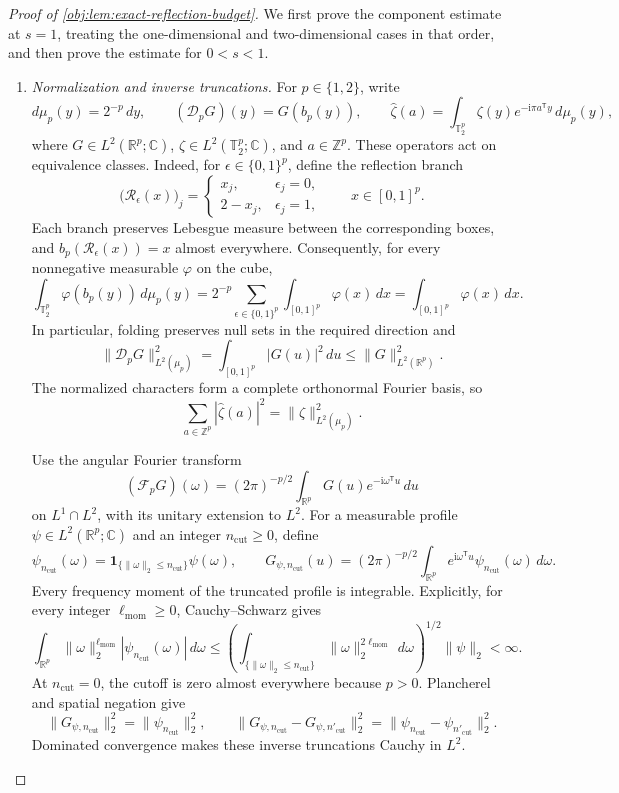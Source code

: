 \documentclass[11pt]{article}
\begin{document}
\begin{proof}[Proof of \cref{obj:lem:exact-reflection-budget}]
We first prove the component estimate at \(s=1\), treating the one-dimensional and two-dimensional cases in that order, and then prove the estimate for \(0<s<1\).

\begin{enumerate}
\item \textit{Normalization and inverse truncations.}
For \(p\in\{1,2\}\), write
\[
d\mu_p(y)=2^{-p}\,dy,
\qquad
(\mathscr D_pG)(y)=G(b_p(y)),
\qquad
\widehat\zeta(a)=
\int_{\mathbb T_2^p}\zeta(y)e^{-\mathrm i\pi a^{\mathsf T}y}\,d\mu_p(y),
\]
where \(G\in L^2(\mathbb R^p;\mathbb C)\), \(\zeta\in L^2(\mathbb T_2^p;\mathbb C)\), and \(a\in\mathbb Z^p\). These operators act on equivalence classes. Indeed, for \(\epsilon\in\{0,1\}^p\), define the reflection branch
\[
\bigl(\mathscr R_\epsilon(x)\bigr)_j
=
\begin{cases}
x_j,&\epsilon_j=0,\\
2-x_j,&\epsilon_j=1,
\end{cases}
\qquad x\in[0,1]^p.
\]
Each branch preserves Lebesgue measure between the corresponding boxes, and
\(b_p(\mathscr R_\epsilon(x))=x\) almost everywhere. Consequently, for every nonnegative measurable \(\varphi\) on the cube,
\[
\int_{\mathbb T_2^p}\varphi(b_p(y))\,d\mu_p(y)
=
2^{-p}\sum_{\epsilon\in\{0,1\}^p}
\int_{[0,1]^p}\varphi(x)\,dx
=
\int_{[0,1]^p}\varphi(x)\,dx.
\]
In particular, folding preserves null sets in the required direction and
\[
\|\mathscr D_pG\|_{L^2(\mu_p)}^2
=
\int_{[0,1]^p}|G(u)|^2\,du
\leq
\|G\|_{L^2(\mathbb R^p)}^2.
\]
The normalized characters form a complete orthonormal Fourier basis, so
\[
\sum_{a\in\mathbb Z^p}|\widehat\zeta(a)|^2
=
\|\zeta\|_{L^2(\mu_p)}^2.
\]

Use the angular Fourier transform
\[
(\mathcal F_pG)(\omega)
=
(2\pi)^{-p/2}
\int_{\mathbb R^p}G(u)e^{-\mathrm i\omega^{\mathsf T}u}\,du
\]
on \(L^1\cap L^2\), with its unitary extension to \(L^2\).
For a measurable profile \(\psi\in L^2(\mathbb R^p;\mathbb C)\) and an integer
\(n_{\mathrm{cut}}\geq0\), define
\[
\psi_{n_{\mathrm{cut}}}(\omega)
=
\mathbf1_{\{\|\omega\|_2\leq n_{\mathrm{cut}}\}}\psi(\omega),
\qquad
G_{\psi,n_{\mathrm{cut}}}(u)
=
(2\pi)^{-p/2}
\int_{\mathbb R^p}
e^{\mathrm i\omega^{\mathsf T}u}
\psi_{n_{\mathrm{cut}}}(\omega)\,d\omega.
\]
Every frequency moment of the truncated profile is integrable. Explicitly, for every integer \(\ell_{\mathrm{mom}}\geq0\), Cauchy--Schwarz gives
\[
\int_{\mathbb R^p}
\|\omega\|_2^{\ell_{\mathrm{mom}}}
|\psi_{n_{\mathrm{cut}}}(\omega)|\,d\omega
\leq
\left(
\int_{\{\|\omega\|_2\leq n_{\mathrm{cut}}\}}
\|\omega\|_2^{2\ell_{\mathrm{mom}}}\,d\omega
\right)^{1/2}
\|\psi\|_2
<\infty.
\]
At \(n_{\mathrm{cut}}=0\), the cutoff is zero almost everywhere because \(p>0\).
Plancherel and spatial negation give
\[
\|G_{\psi,n_{\mathrm{cut}}}\|_2^2
=
\|\psi_{n_{\mathrm{cut}}}\|_2^2,
\qquad
\|G_{\psi,n_{\mathrm{cut}}}-G_{\psi,n'_{\mathrm{cut}}}\|_2^2
=
\|\psi_{n_{\mathrm{cut}}}-\psi_{n'_{\mathrm{cut}}}\|_2^2.
\]
Dominated convergence makes these inverse truncations Cauchy in \(L^2\).


\end{enumerate}
\end{proof}
\end{document}
